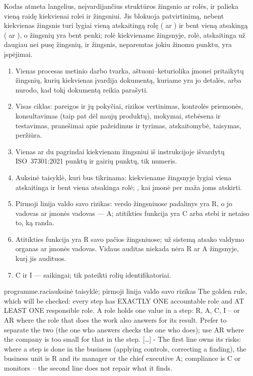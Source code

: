 Kodas atmeta langelius, neįvardijančius struktūros žingsnio ar rolės, ir palieka vieną raidę
kiekvienai rolei ir žingsniui. Jis blokuoja patvirtinimą, nebent kiekvienas žingsnis turi lygiai
vieną atskaitingą rolę ( ar ) ir bent vieną atsakingą ( ar ),
o žingsnių yra bent penki; rolė kiekviename žingsnyje, rolė, atskaitinga už daugiau nei pusę
žingsnių, ir žingsnis, neparemtas jokiu žinomu punktu, yra įspėjimai.

\begin{enumerate}[itemsep=1pt, topsep=3pt]
  \item Vienas procesas metinio darbo tvarka, aštuoni--keturiolika įmonei pritaikytų žingsnių,
    kurių kiekvienas įvardija dokumentą, kuriame yra jo detalės, arba nurodo, kad tokį dokumentą
    reikia parašyti.
  \item Visas ciklas: pareigos ir jų pokyčiai, rizikos vertinimas, kontrolės priemonės,
    konsultavimas (taip pat dėl naujų produktų), mokymai, stebėsena ir testavimas, pranešimai
    apie pažeidimus ir tyrimas, atskaitomybė, taisymas, peržiūra.
  \item Vienas ar du pagrindai kiekvienam žingsniui iš instrukcijoje išvardytų ISO~37301:2021
    punktų ir gairių punktų, tik numeris.
  \item Auksinė taisyklė, kuri bus tikrinama: kiekviename žingsnyje lygiai viena atskaitinga ir
    bent viena atsakinga rolė; , kai įmonė per maža joms atskirti.
  \item Pirmoji linija valdo savo rizikas: verslo žingsniuose padalinys yra R, o jo vadovas ar
    įmonės vadovas --- A; atitikties funkcija yra C arba stebi ir netaiso to, ką randa.
  \item Atitikties funkcija yra R savo pačios žingsniuose; už sistemą atsako valdymo organas ar įmonės
    vadovas. Vidaus auditas niekada nėra R ar A žingsnyje, kurį jis audituos.
  \item C ir I --- saikingai; tik pateikti rolių identifikatoriai.
\end{enumerate}

\par\nopagebreak
\begin{promptexcerpt}{programme.raci}{auksinė taisyklė; pirmoji linija valdo savo rizikas}
The golden rule, which will be checked: every step has EXACTLY ONE accountable role and AT LEAST ONE responsible role. A role holds one value in a step: R, A, C, I – or AR where the role that does the work also answers for its result. Prefer to separate the two (the one who answers checks the one who does); use AR where the company is too small for that in the step.
[…]
- The first line owns its risks: where a step is done in the business (applying controls, correcting a finding), the business unit is R and its manager or the chief executive A; compliance is C or monitors – the second line does not repair what it finds.
\end{promptexcerpt}


